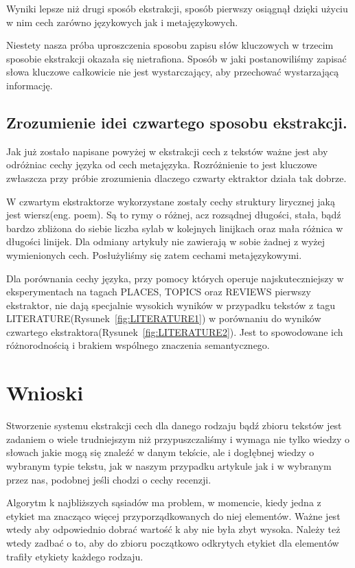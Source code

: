 \documentclass{classrep}
\begin{document}
    Wyniki lepsze niż drugi sposób ekstrakcji, sposób pierwszy osiągnął dzięki użyciu w nim cech zarówno językowych jak i metajęzykowych.
    
    Niestety nasza próba uproszczenia sposobu zapisu słów kluczowych w trzecim sposobie ekstrakcji okazała się nietrafiona. Sposób w jaki postanowiliśmy zapisać słowa kluczowe całkowicie nie jest wystarczający, aby przechować wystarzającą informację.
    
\subsection{Zrozumienie idei czwartego sposobu ekstrakcji.}
    Jak już zostało napisane powyżej w ekstrakcji cech z tekstów ważne jest aby odróżniac cechy języka od cech metajęzyka. Rozróżnienie to jest kluczowe zwłaszcza przy próbie zrozumienia dlaczego czwarty ektraktor działa tak dobrze.
    
    W czwartym ekstraktorze wykorzystane zostały cechy struktury lirycznej jaką jest wiersz(eng. poem). Są to rymy o różnej, acz rozsądnej długości, stała, bądź bardzo zbliżona do siebie liczba sylab w kolejnych linijkach oraz mała różnica w długości linijek. Dla odmiany artykuły nie zawierają w sobie żadnej z wyżej wymienionych cech. Posłużyliśmy się zatem cechami metajęzykowymi.
    
    Dla porównania cechy języka, przy pomocy których operuje najskuteczniejszy w eksperymentach na tagach PLACES, TOPICS oraz REVIEWS pierwszy ekstraktor, nie dają specjalnie wysokich wyników w przypadku tekstów z tagu LITERATURE(Rysunek~\ref{fig:LITERATURE1}) w porównaniu do wyników czwartego ekstraktora(Rysunek~\ref{fig:LITERATURE2}). Jest to spowodowane ich różnorodnością i brakiem wspólnego znaczenia semantycznego.
    
\section{Wnioski}
	Stworzenie systemu ekstrakcji cech dla danego rodzaju bądź zbioru tekstów jest zadaniem o wiele trudniejszym niż przypuszczaliśmy i wymaga nie tylko wiedzy o słowach jakie mogą się znaleźć w danym tekście, ale i dogłębnej wiedzy o wybranym typie tekstu, jak w naszym przypadku artykule jak i w wybranym przez nas, podobnej jeśli chodzi o cechy recenzji.
	
	Algorytm k najbliższych sąsiadów ma problem, w momencie, kiedy jedna z etykiet ma znacząco więcej przyporządkowanych do niej elementów. Ważne jest wtedy aby odpowiednio dobrać wartość k aby nie była zbyt wysoka. Należy też wtedy zadbać o to, aby do zbioru początkowo odkrytych etykiet dla elementów trafiły etykiety każdego rodzaju.
	
\end{document}

